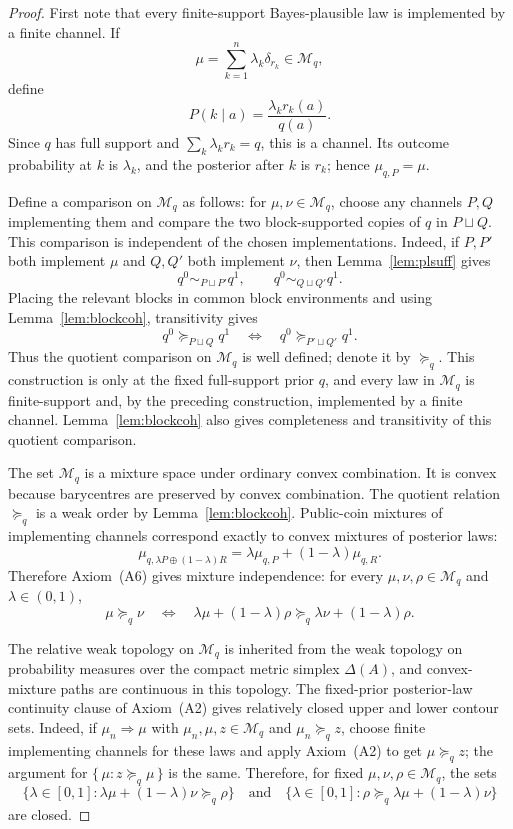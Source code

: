 \documentclass[11pt,a4paper]{article}
\theoremstyle{definition}
\newcommand{\1}{\mathbf 1}
\begin{document}
\begin{proof}
First note that every finite-support Bayes-plausible law is implemented by a finite channel.  If
\[
\mu=\sum_{k=1}^n\lambda_k\delta_{r_k}\in\mathcal M_q,
\]
define
\[
P(k\mid a)=\frac{\lambda_k r_k(a)}{q(a)}.
\]
Since $q$ has full support and $\sum_k\lambda_k r_k=q$, this is a channel.  Its outcome probability at $k$ is
$\lambda_k$, and the posterior after $k$ is $r_k$; hence $\mu_{q,P}=\mu$.

Define a comparison on $\mathcal M_q$ as follows: for $\mu,\nu\in\mathcal M_q$, choose any channels $P,Q$ implementing
them and compare the two block-supported copies of $q$ in $P\sqcup Q$.  This comparison is independent of the chosen
implementations.  Indeed, if $P,P'$ both implement $\mu$ and $Q,Q'$ both implement $\nu$, then
Lemma~\ref{lem:plsuff} gives
\[
q^0\sim_{P\sqcup P'}q^1,
\qquad
q^0\sim_{Q\sqcup Q'}q^1.
\]
Placing the relevant blocks in common block environments and using Lemma~\ref{lem:blockcoh}, transitivity gives
\[
q^0\succeq_{P\sqcup Q}q^1
\quad\Longleftrightarrow\quad
q^0\succeq_{P'\sqcup Q'}q^1.
\]
Thus the quotient comparison on $\mathcal M_q$ is well defined; denote it by $\succeq_q$.  This construction is only at
the fixed full-support prior $q$, and every law in $\mathcal M_q$ is finite-support and, by the preceding construction,
implemented by a finite channel.  Lemma~\ref{lem:blockcoh} also gives completeness and transitivity of this quotient
comparison.

The set $\mathcal M_q$ is a mixture space under ordinary convex combination.  It is convex because barycentres are
preserved by convex combination.  The quotient relation $\succeq_q$ is a weak order by Lemma~\ref{lem:blockcoh}.
Public-coin mixtures of implementing channels correspond exactly to convex mixtures of posterior laws:
\[
\mu_{q,\lambda P\oplus(1-\lambda)R}
=
\lambda\mu_{q,P}+(1-\lambda)\mu_{q,R}.
\]
Therefore Axiom~\textup{(A6)} gives mixture independence: for every $\mu,\nu,\rho\in\mathcal M_q$ and
$\lambda\in(0,1)$,
\[
\mu\succeq_q\nu
\quad\Longleftrightarrow\quad
\lambda\mu+(1-\lambda)\rho
\succeq_q
\lambda\nu+(1-\lambda)\rho.
\]

The relative weak topology on $\mathcal M_q$ is inherited from the weak topology on probability measures over the compact
metric simplex $\Delta(A)$, and convex-mixture paths are continuous in this topology.  The fixed-prior posterior-law
continuity clause of Axiom~\textup{(A2)} gives relatively closed upper and lower contour sets.  Indeed, if
$\mu_n\Rightarrow\mu$ with $\mu_n,\mu,z\in\mathcal M_q$ and $\mu_n\succeq_q z$, choose finite implementing channels for
these laws and apply Axiom~\textup{(A2)} to get $\mu\succeq_q z$; the argument for $\{\,\mu:z\succeq_q\mu\,\}$ is the
same.  Therefore, for fixed $\mu,\nu,\rho\in\mathcal M_q$, the sets
\[
\{\lambda\in[0,1]:\lambda\mu+(1-\lambda)\nu\succeq_q\rho\}
\quad\text{and}\quad
\{\lambda\in[0,1]:\rho\succeq_q\lambda\mu+(1-\lambda)\nu\}
\]
are closed.


\end{proof}
\end{document}

